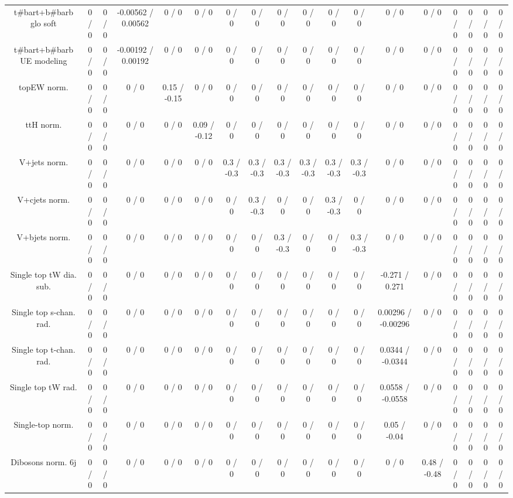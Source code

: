 \documentclass[10pt]{article}
\begin{document}
\begin{table}[htbp]
\begin{center}
\begin{tabular}{|c|c|c|c|c|c|c|c|c|c|c|c|c|c|c|c|c|c|}
  t#bar{t}+b#bar{b} glo soft & 0 / 0 & 0 / 0 & -0.00562 / 0.00562 & 0 / 0 & 0 / 0 & 0 / 0 & 0 / 0 & 0 / 0 & 0 / 0 & 0 / 0 & 0 / 0 & 0 / 0 & 0 / 0 & 0 / 0 & 0 / 0 & 0 / 0 & 0 / 0 \\ 
  t#bar{t}+b#bar{b} UE modeling & 0 / 0 & 0 / 0 & -0.00192 / 0.00192 & 0 / 0 & 0 / 0 & 0 / 0 & 0 / 0 & 0 / 0 & 0 / 0 & 0 / 0 & 0 / 0 & 0 / 0 & 0 / 0 & 0 / 0 & 0 / 0 & 0 / 0 & 0 / 0 \\ 
  topEW norm. & 0 / 0 & 0 / 0 & 0 / 0 & 0.15 / -0.15 & 0 / 0 & 0 / 0 & 0 / 0 & 0 / 0 & 0 / 0 & 0 / 0 & 0 / 0 & 0 / 0 & 0 / 0 & 0 / 0 & 0 / 0 & 0 / 0 & 0 / 0 \\ 
  ttH norm. & 0 / 0 & 0 / 0 & 0 / 0 & 0 / 0 & 0.09 / -0.12 & 0 / 0 & 0 / 0 & 0 / 0 & 0 / 0 & 0 / 0 & 0 / 0 & 0 / 0 & 0 / 0 & 0 / 0 & 0 / 0 & 0 / 0 & 0 / 0 \\ 
  V+jets norm. & 0 / 0 & 0 / 0 & 0 / 0 & 0 / 0 & 0 / 0 & 0.3 / -0.3 & 0.3 / -0.3 & 0.3 / -0.3 & 0.3 / -0.3 & 0.3 / -0.3 & 0.3 / -0.3 & 0 / 0 & 0 / 0 & 0 / 0 & 0 / 0 & 0 / 0 & 0 / 0 \\ 
  V+cjets norm. & 0 / 0 & 0 / 0 & 0 / 0 & 0 / 0 & 0 / 0 & 0 / 0 & 0.3 / -0.3 & 0 / 0 & 0 / 0 & 0.3 / -0.3 & 0 / 0 & 0 / 0 & 0 / 0 & 0 / 0 & 0 / 0 & 0 / 0 & 0 / 0 \\ 
  V+bjets norm. & 0 / 0 & 0 / 0 & 0 / 0 & 0 / 0 & 0 / 0 & 0 / 0 & 0 / 0 & 0.3 / -0.3 & 0 / 0 & 0 / 0 & 0.3 / -0.3 & 0 / 0 & 0 / 0 & 0 / 0 & 0 / 0 & 0 / 0 & 0 / 0 \\ 
  Single top tW dia. sub. & 0 / 0 & 0 / 0 & 0 / 0 & 0 / 0 & 0 / 0 & 0 / 0 & 0 / 0 & 0 / 0 & 0 / 0 & 0 / 0 & 0 / 0 & -0.271 / 0.271 & 0 / 0 & 0 / 0 & 0 / 0 & 0 / 0 & 0 / 0 \\ 
  Single top s-chan. rad. & 0 / 0 & 0 / 0 & 0 / 0 & 0 / 0 & 0 / 0 & 0 / 0 & 0 / 0 & 0 / 0 & 0 / 0 & 0 / 0 & 0 / 0 & 0.00296 / -0.00296 & 0 / 0 & 0 / 0 & 0 / 0 & 0 / 0 & 0 / 0 \\ 
  Single top t-chan. rad. & 0 / 0 & 0 / 0 & 0 / 0 & 0 / 0 & 0 / 0 & 0 / 0 & 0 / 0 & 0 / 0 & 0 / 0 & 0 / 0 & 0 / 0 & 0.0344 / -0.0344 & 0 / 0 & 0 / 0 & 0 / 0 & 0 / 0 & 0 / 0 \\ 
  Single top tW rad. & 0 / 0 & 0 / 0 & 0 / 0 & 0 / 0 & 0 / 0 & 0 / 0 & 0 / 0 & 0 / 0 & 0 / 0 & 0 / 0 & 0 / 0 & 0.0558 / -0.0558 & 0 / 0 & 0 / 0 & 0 / 0 & 0 / 0 & 0 / 0 \\ 
  Single-top norm. & 0 / 0 & 0 / 0 & 0 / 0 & 0 / 0 & 0 / 0 & 0 / 0 & 0 / 0 & 0 / 0 & 0 / 0 & 0 / 0 & 0 / 0 & 0.05 / -0.04 & 0 / 0 & 0 / 0 & 0 / 0 & 0 / 0 & 0 / 0 \\ 
  Dibosons norm. 6j & 0 / 0 & 0 / 0 & 0 / 0 & 0 / 0 & 0 / 0 & 0 / 0 & 0 / 0 & 0 / 0 & 0 / 0 & 0 / 0 & 0 / 0 & 0 / 0 & 0.48 / -0.48 & 0 / 0 & 0 / 0 & 0 / 0 & 0 / 0 \\ 

\end{tabular}
\end{center}
\end{table}
\end{document}
